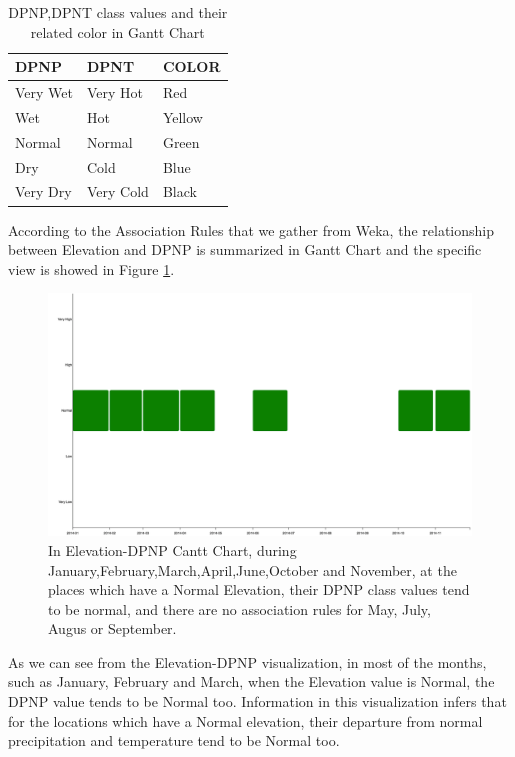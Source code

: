 \documentclass[11pt]{article}
\begin{document}
\begin{table}
\centering
\begin{tabularx}{\textwidth}{|X|X|X|}
  \hline
  \textbf{DPNP} & \textbf{DPNT} & \textbf{COLOR}\\
  \hline\hline
  Very Wet & Very Hot & Red\\
  \hline
  Wet & Hot & Yellow\\
  \hline
  Normal & Normal & Green\\
  \hline
  Dry & Cold & Blue \\
  \hline
  Very Dry & Very Cold & Black \\
  \hline

\end{tabularx}
\caption{DPNP,DPNT class values and their related color in Gantt Chart}
                \label{table:DPNP-DPNT-COLOR}
                \end{table}

According to the Association Rules that we gather from Weka, the relationship between Elevation and DPNP is summarized in Gantt Chart and the specific view is showed in Figure \ref{fig:Gantt Chart for DPNP}.

\begin{figure}
  \centering
  \includegraphics[width=\textwidth]{fig/ganttchart-dpnp.png}
  \caption{In Elevation-DPNP Cantt Chart, during January,February,March,April,June,October and November, at the places which have a Normal Elevation, their DPNP class values tend to be normal, and there are no association rules for May, July, Augus or September.}
  \label{fig:Gantt Chart for DPNP}
  \vspace{-0.1 in}
\end{figure}

As we can see from the Elevation-DPNP visualization, in most of the months, such as January, February and March, when the Elevation value is Normal, the DPNP value tends to be Normal too. Information in this visualization infers that for the locations which have a Normal elevation, their departure from normal precipitation and temperature tend to be Normal too.
\end{document}
